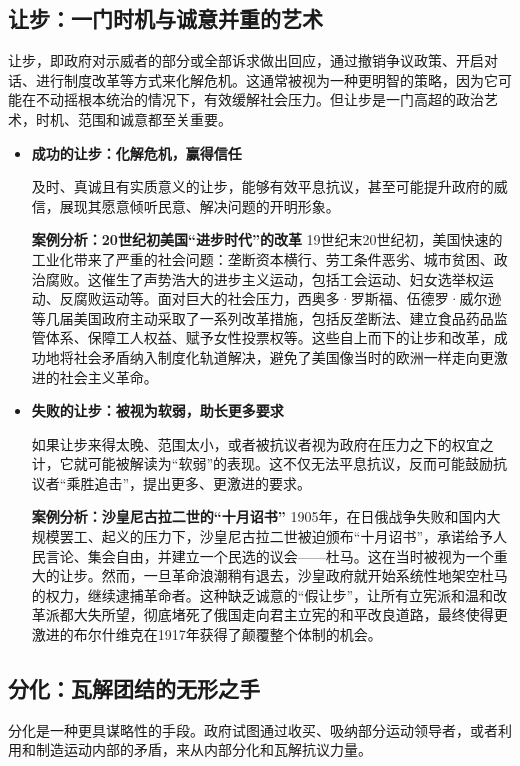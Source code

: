 \subsection{让步：一门时机与诚意并重的艺术}

让步，即政府对示威者的部分或全部诉求做出回应，通过撤销争议政策、开启对话、进行制度改革等方式来化解危机。这通常被视为一种更明智的策略，因为它可能在不动摇根本统治的情况下，有效缓解社会压力。但让步是一门高超的政治艺术，时机、范围和诚意都至关重要。

\begin{itemize}
    \item \textbf{成功的让步：化解危机，赢得信任}

    及时、真诚且有实质意义的让步，能够有效平息抗议，甚至可能提升政府的威信，展现其愿意倾听民意、解决问题的开明形象。

    \textbf{案例分析：20世纪初美国“进步时代”的改革}
    19世纪末20世纪初，美国快速的工业化带来了严重的社会问题：垄断资本横行、劳工条件恶劣、城市贫困、政治腐败。这催生了声势浩大的进步主义运动，包括工会运动、妇女选举权运动、反腐败运动等。面对巨大的社会压力，西奥多·罗斯福、伍德罗·威尔逊等几届美国政府主动采取了一系列改革措施，包括反垄断法、建立食品药品监管体系、保障工人权益、赋予女性投票权等。这些自上而下的让步和改革，成功地将社会矛盾纳入制度化轨道解决，避免了美国像当时的欧洲一样走向更激进的社会主义革命。

    \item \textbf{失败的让步：被视为软弱，助长更多要求}

    如果让步来得太晚、范围太小，或者被抗议者视为政府在压力之下的权宜之计，它就可能被解读为“软弱”的表现。这不仅无法平息抗议，反而可能鼓励抗议者“乘胜追击”，提出更多、更激进的要求。

    \textbf{案例分析：沙皇尼古拉二世的“十月诏书”}
    1905年，在日俄战争失败和国内大规模罢工、起义的压力下，沙皇尼古拉二世被迫颁布“十月诏书”，承诺给予人民言论、集会自由，并建立一个民选的议会——杜马。这在当时被视为一个重大的让步。然而，一旦革命浪潮稍有退去，沙皇政府就开始系统性地架空杜马的权力，继续逮捕革命者。这种缺乏诚意的“假让步”，让所有立宪派和温和改革派都大失所望，彻底堵死了俄国走向君主立宪的和平改良道路，最终使得更激进的布尔什维克在1917年获得了颠覆整个体制的机会。
\end{itemize}

\subsection{分化：瓦解团结的无形之手}

分化是一种更具谋略性的手段。政府试图通过收买、吸纳部分运动领导者，或者利用和制造运动内部的矛盾，来从内部分化和瓦解抗议力量。

